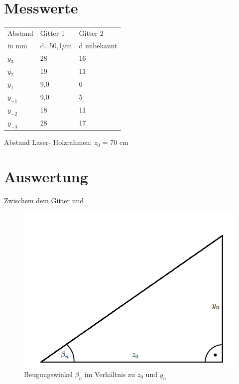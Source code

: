 \documentclass[12pt,a4paper,titlepage,headinclude,bibtotoc]{scrartcl}
\begin{document}
\section{Messwerte}



\begin{table} [h]
\centering
\begin{large}

\end{large}
\begin{tabular}{|p{4 cm}||p{4 cm}|p{4 cm}|}
        \hline
          Abstand  & Gitter 1  & Gitter 2 \\
          in mm & d=50,1$\mu$m & d unbekannt\\
         \hline 
         $y_3 $& 28 & 16 \\
         \hline
         $y_2 $& 19 & 11\\
         \hline
         $y_{1} $& 9,0 & 6 \\
         \hline
         $y_{-1}$& 9,0 & 5 \\
         \hline
         $y_{-2}$& 18 & 11 \\
         \hline             
         $y_{-3}$& 28 & 17 \\
         \hline
\end{tabular}
\end{table}



Abstand Laser- Holzrahmen: $z_0$ = 70 cm



\section{Auswertung}

Zwischem dem Gitter und  

\begin{figure} [h]
\begin{center}
\includegraphics[scale=0.4]{Dreieck.png} \end{center}
\caption{Beugungswinkel $\beta_n$ im Verhältnis zu $z_0$ und $y_n$}
\end{figure}
\end{document}
